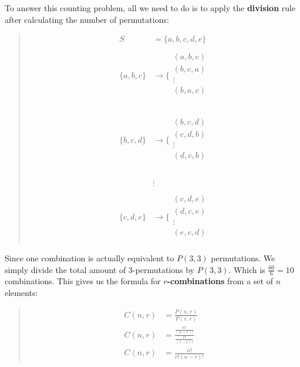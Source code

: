 To answer this counting problem, all we need to do is to apply the
\textbf{division} rule after calculating the number of permutations:

\begin{quote}
\[
\begin{aligned}
S&=\{a,b,c,d,e\}\\\\
\{a,b,c\}&\to\Bigg\{
  \begin{matrix}
      (a,b,c)\\
      (b,c,a)\\
      \vdots\\
      (b,a,c)\\
  \end{matrix}\\
  \end{aligned}
\]

\[
\begin{aligned}
\{b,c,d\}&\to\Bigg\{
  \begin{matrix}
      (b,c,d)\\
      (c,d,b)\\
      \vdots\\
      (d,c,b)\\
  \end{matrix}\\
  \end{aligned}
\]

\[
\begin{aligned}
  &\vdots\\
  \\
  \{c,d,e\}&\to\Bigg\{
  \begin{matrix}
      (c,d,e)\\
      (d,c,e)\\
      \vdots\\
      (e,c,d)\\
  \end{matrix}
\end{aligned}
\]
\end{quote}

Since one combination is actually equivalent to \textbf{\(P(3,3)\)}
permutations. We simply divide the total amount of 3-permutations by
\textbf{\(P(3,3)\)}. Which is \textbf{\(\frac{60}{6}=10\)} combinations.
This gives us the formula for \textbf{\(r\)-combinations} from a set of
\textbf{\(n\)} elements:

\begin{quote}
\[
\begin{aligned}
C(n,r)&=\frac{P(n,r)}{P(r,r)}\\
C(n,r)&=\frac{\frac{n!}{(n-r)!}}{\frac{r!}{(r-r)!}}\\
C(n,r)&=\frac{n!}{r!(n-r)!}
\end{aligned}
\]
\end{quote}

